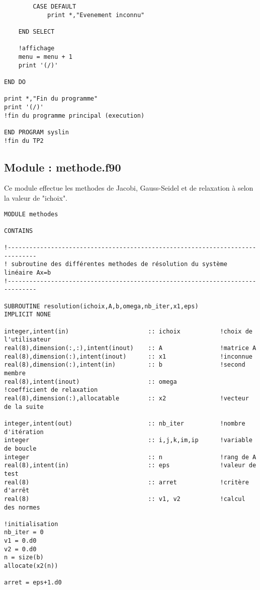 \documentclass{report}
\begin{document}
\begin{small}
\begin{verbatim}
        CASE DEFAULT
            print *,"Evenement inconnu"

    END SELECT

    !affichage
    menu = menu + 1
    print '(/)'

END DO

print *,"Fin du programme"
print '(/)'
!fin du programme principal (execution)

END PROGRAM syslin
!fin du TP2
\end{verbatim}
\end{small}
\subsection{Module : methode.f90}
Ce module effectue les methodes de Jacobi, Gauss-Seidel et de relaxation à selon
la valeur de "ichoix".
\begin{small}
\begin{verbatim}
MODULE methodes

CONTAINS

!------------------------------------------------------------------------------
! subroutine des différentes methodes de résolution du système linéaire Ax=b
!------------------------------------------------------------------------------

SUBROUTINE resolution(ichoix,A,b,omega,nb_iter,x1,eps)
IMPLICIT NONE

integer,intent(in)                      :: ichoix           !choix de l'utilisateur
real(8),dimension(:,:),intent(inout)    :: A                !matrice A
real(8),dimension(:),intent(inout)      :: x1               !inconnue
real(8),dimension(:),intent(in)         :: b                !second membre
real(8),intent(inout)                   :: omega            !coefficient de relaxation
real(8),dimension(:),allocatable        :: x2               !vecteur de la suite

integer,intent(out)                     :: nb_iter          !nombre d'itération
integer                                 :: i,j,k,im,ip      !variable de boucle
integer                                 :: n                !rang de A
real(8),intent(in)                      :: eps              !valeur de test
real(8)                                 :: arret            !critère d'arrêt
real(8)                                 :: v1, v2           !calcul des normes

!initialisation
nb_iter = 0
v1 = 0.d0
v2 = 0.d0
n = size(b)
allocate(x2(n))

arret = eps+1.d0


\end{verbatim}
\end{small}
\end{document}
